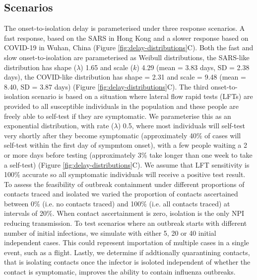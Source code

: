 \documentclass{article}
\begin{document}
\clearpage

\subsection*{Scenarios}

The onset-to-isolation delay is parameterised under three response scenarios. A fast response, based on the SARS in Hong Kong \citep{donnellyEpidemiologicalDeterminantsSpread2003a} and a slower response based on COVID-19 in Wuhan, China \citep{liEarlyTransmissionDynamics2020} (Figure \ref{fig:delay-distributions}C). Both the fast and slow onset-to-isolation are parameterised as Weibull distributions, the SARS-like distribution has shape ($\lambda$) 1.65 and scale ($k$) 4.29 (mean = 3.83 days, SD = 2.38 days), the COVID-like distribution has shape = 2.31 and scale = 9.48 (mean = 8.40, SD = 3.87 days) (Figure \ref{fig:delay-distributions}C). The third onset-to-isolation scenario is based on a situation where lateral flow rapid tests (LFTs) are provided to all susceptible individuals in the population and these people are freely able to self-test if they are symptomatic. We parameterise this as an exponential distribution, with rate ($\lambda$) 0.5, where most individuals will self-test very shortly after they become symptomatic (approximately 40\% of cases will self-test within the first day of sympmtom onset), with a few people waiting a 2 or more days before testing (approximately 3\% take longer than one week to take a self-test) (Figure \ref{fig:delay-distributions}C). We assume that LFT sensitivity is 100\% accurate so all symptomatic individuals will receive a positive test result. \\

To assess the feasibility of outbreak containment under different proportions of contacts traced and isolated we varied the proportion of contacts ascertained between 0\% (i.e. no contacts traced) and 100\% (i.e. all contacts traced) at intervals of 20\%. When contact ascertainment is zero, isolation is the only NPI reducing transmission. To test scenarios where an outbreak starts with different number of initial infections, we simulate with either 5, 20 or 40 initial independent cases. This could represent importation of multiple cases in a single event, such as a flight. Lastly, we determine if addtionally quarantining contacts, that is isolating contacts once the infector is isoloted independent of whether the contact is symptomatic, improves the ability to contain influenza outbreaks.
\end{document}
